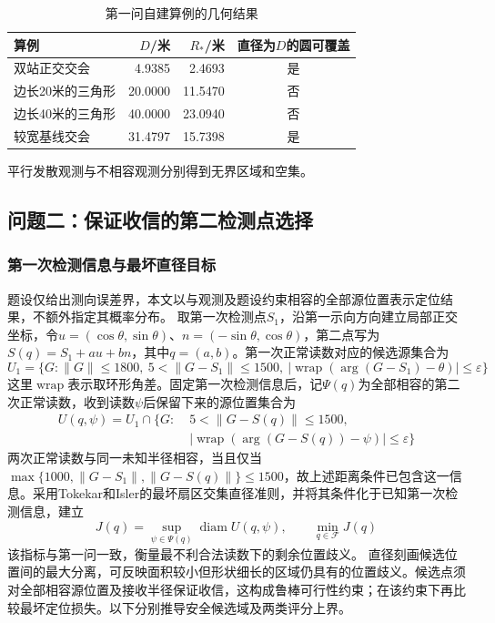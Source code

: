 \documentclass{JXUSTmodeling}
\begin{document}
\begin{table}[htbp]
 \centering
 \caption{第一问自建算例的几何结果}
 \label{tab:p1_geometry}
 \begin{tabular}{lrrc}
 \hline
 算例 & $D$/米 & $R_*$/米 & 直径为$D$的圆可覆盖\\
 \hline
 双站正交交会 & 4.9385 & 2.4693 & 是\\
 边长20米的三角形 & 20.0000 & 11.5470 & 否\\
 边长40米的三角形 & 40.0000 & 23.0940 & 否\\
 较宽基线交会 & 31.4797 & 15.7398 & 是\\
 \hline
 \end{tabular}
\end{table}
平行发散观测与不相容观测分别得到无界区域和空集。
\FloatBarrier

\subsection{问题二：保证收信的第二检测点选择}
\label{sub:model_p2}
\subsubsection{第一次检测信息与最坏直径目标}
题设仅给出测向误差界，本文以与观测及题设约束相容的全部源位置表示定位结果，不额外指定其概率分布。
取第一次检测点$S_1$，沿第一示向方向建立局部正交坐标，令$u=(\cos\theta,\sin\theta)$、$n=(-\sin\theta,\cos\theta)$，第二点写为$S(q)=S_1+a u+b n$，其中$q=(a,b)$。第一次正常读数对应的候选源集合为
\begin{equation}
 U_1=\{G:\|G\|\le1800,\ 5<\|G-S_1\|\le1500,
 \ |\operatorname{wrap}(\arg(G-S_1)-\theta)|\le\varepsilon\}
\end{equation}
这里$\operatorname{wrap}$表示取环形角差。固定第一次检测信息后，记$\Psi(q)$为全部相容的第二次正常读数，收到读数$\psi$后保留下来的源位置集合为
\begin{equation}
 \begin{aligned}
 U(q,\psi)=U_1\cap\{G:\;&5<\|G-S(q)\|\le1500,\\
 &|\operatorname{wrap}(\arg(G-S(q))-\psi)|\le\varepsilon\}
 \end{aligned}
\end{equation}
两次正常读数与同一未知半径相容，当且仅当$\max\{1000,\|G-S_1\|,\|G-S(q)\|\}\le1500$，故上述距离条件已包含这一信息。采用Tokekar和Isler的最坏扇区交集直径准则\cite{tokekar}，并将其条件化于已知第一次检测信息，建立
\begin{equation}
 J(q)=\sup_{\psi\in\Psi(q)}\operatorname{diam}U(q,\psi),\qquad
 \min_{q\in\mathcal F}J(q)
 \label{eq:p2_objective}
\end{equation}
该指标与第一问一致，衡量最不利合法读数下的剩余位置歧义。
直径刻画候选位置间的最大分离，可反映面积较小但形状细长的区域仍具有的位置歧义。候选点须对全部相容源位置及接收半径保证收信，这构成鲁棒可行性约束\cite{bertsimas2011}；在该约束下再比较最坏定位损失。以下分别推导安全候选域及两类评分上界。
\end{document}
